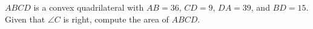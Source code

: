 $ABCD$ is a convex quadrilateral with $AB=36$, $CD=9$, $DA=39$, and $BD=15$. Given that $\angle{C}$ is right, compute the area of $ABCD$.